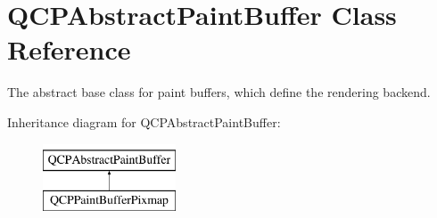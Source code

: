 \hypertarget{class_q_c_p_abstract_paint_buffer}{}\section{Q\+C\+P\+Abstract\+Paint\+Buffer Class Reference}
\label{class_q_c_p_abstract_paint_buffer}


The abstract base class for paint buffers, which define the rendering backend.  


Inheritance diagram for Q\+C\+P\+Abstract\+Paint\+Buffer\+:\begin{figure}[H]
\begin{center}
\leavevmode
\includegraphics[height=2.000000cm]{class_q_c_p_abstract_paint_buffer}
\end{center}
\end{figure}
